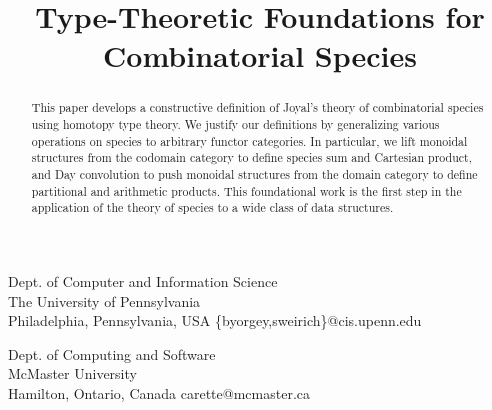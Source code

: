 \documentclass[preprint,authoryear]{sigplanconf}
\begin{document}
\setlength{\pdfpageheight}{\paperheight}
\setlength{\pdfpagewidth}{\paperwidth}



\exclusivelicense                %



\title{Type-Theoretic Foundations for Combinatorial Species}

{Dept. of Computer and Information Science\\ The University of Pennsylvania\\
Philadelphia, Pennsylvania, USA}
{\{byorgey,sweirich\}@cis.upenn.edu}

{Dept. of Computing and Software\\ McMaster University\\
Hamilton, Ontario, Canada}
{carette@mcmaster.ca}

\maketitle

\begin{abstract}
  This paper develops a constructive definition of Joyal's theory of
  combinatorial species using homotopy type theory. We justify our definitions
  by generalizing various operations on species to arbitrary functor
  categories. In particular, we lift monoidal structures from the codomain
  category to define species sum and
  Cartesian product, and Day convolution to push monoidal structures from
  the domain category to define partitional and arithmetic
  products. This foundational work is the first step in the application of the
  theory of species to a wide class of data structures.
\end{abstract}
\end{document}
